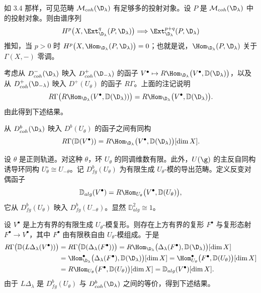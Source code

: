 如 3.4 那样，可见范畴 $\mathcal{M}_{coh}(\D_\lambda)$ 有足够多的投射对象。设 $P$ 是 $\mathcal{M}_{coh}(\D_\lambda)$ 中的投射对象。则由谱序列
$$H^p\bigl(X,\Ext^q_{\D_\lambda}(P,\D_\lambda)\bigr)\Longrightarrow\Ext^{p+q}_{\D_\lambda}(P,\D_\lambda)$$
推知，当 $p>0$ 时 $H^p\bigl(X,\Hom_{\D_\lambda}(P,\D_\lambda)\bigr)=0$；也就是说，$\Hom_{\D_\lambda}(P,\D_\lambda)$ 关于 $\Gamma(X,-)$ 零调。

考虑从 $D^-_{coh}(\D_\lambda)$ 映入 $D^+_{coh}(\D_{-\lambda})$ 的函子 $V^\bullet\mapsto R\Hom_{\D_\lambda}\bigl(V^\bullet,\mathbb{D}(\D_\lambda)\bigr)$，以及从 $D^+_{coh}(\D_{-\lambda})$ 映入 $D^+(U_\theta)$ 的函子 $R\Gamma$。上面的注记说明
$$R\Gamma\bigl(R\Hom_{\D_\lambda}(V^\bullet,\mathbb{D}(\D_\lambda))\bigr)=R\Hom_{\D_\lambda}\bigl(V^\bullet,\mathbb{D}(\D_\lambda)\bigr).$$
由此得到下述结果。

\begin{lemma}\label{lem:03.4.2}
从 $D^b_{coh}(\D_\lambda)$ 映入 $D^b(U_\theta)$ 的函子之间有同构
$$R\Gamma(\mathbb{D}(V^\bullet))=R\Hom_{\D_\lambda}\bigl(V^\bullet,\mathbb{D}(\D_\lambda)\bigr)[\dim X].$$
\end{lemma}

设 $\theta$ 是正则轨道。对这种 $\theta$，环 $U_\theta$ 的同调维数有限。此外，$U(\g)$ 的主反自同构诱导环同构 $U_\theta^\circ\cong U_{-\theta}$。记 $D^b_{fg}(U_\theta)$ 为有限生成 $U_\theta$-模的导出范畴。定义反变对偶函子
$$\mathbb{D}_{alg}(V^\bullet)=R\Hom_{U_\theta}\bigl(V^\bullet,\mathbb{D}(U_\theta)\bigr),$$
它从 $D^b_{fg}(U_\theta)$ 映入 $D^b_{fg}(U_{-\theta})$。显然 $\mathbb{D}_{alg}^2\cong 1$。

设 $V^\bullet$ 是上方有界的有限生成 $U_\theta$-模复形。则存在上方有界的复形 $F^\bullet$ 与复形态射 $F^\bullet\to V^\bullet$，其中 $F^\bullet$ 由有限秩自由 $U_\theta$-模组成。于是
{\small
\begin{align*}
R\Gamma\bigl(\mathbb{D}(L\Delta_\lambda(V^\bullet))\bigr)
&=R\Gamma\bigl(\mathbb{D}(\Delta_\lambda(F^\bullet))\bigr)
=R\Hom_{\D_\lambda}\bigl(\Delta_\lambda(F^\bullet),\mathbb{D}(\D_\lambda)\bigr)[\dim X]\\
&=\Hom^\bullet_{\D_\lambda}\bigl(\Delta_\lambda(F^\bullet),\mathbb{D}(\D_\lambda)\bigr)[\dim X]
=\Hom^\bullet_{U_\theta}\bigl(F^\bullet,\mathbb{D}(U_\theta)\bigr)[\dim X]\\
&=R\Hom_{U_\theta}\bigl(F^\bullet,\mathbb{D}(U_\theta)\bigr)[\dim X]
=\mathbb{D}_{alg}(V^\bullet)[\dim X].
\end{align*}}
由于 $L\Delta_\lambda$ 是 $D^b_{fg}(U_\theta)$ 与 $D^b_{coh}(\D_\lambda)$ 之间的等价，得到下述结果。

